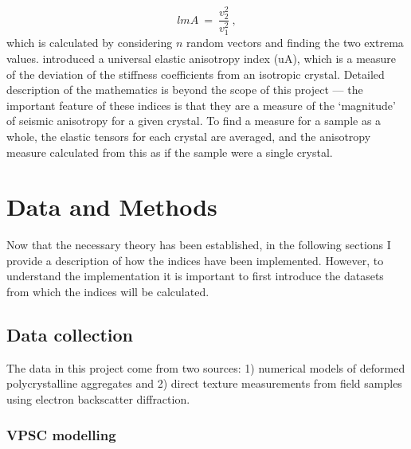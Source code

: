 \documentclass[a4paper,12pt,twoside]{report}
\numberwithin{equation}{chapter}
\begin{document}
\begin{equation}
lmA\ =\ \frac{v_2^2}{v_1^2}\ ,
\end{equation}   
\noindent
which is calculated by considering $n$ random vectors and finding the two extrema values. \cite{Ranganathan2008} introduced a universal elastic anisotropy index (uA), which is a measure of the deviation of the stiffness coefficients from an isotropic crystal. Detailed description of the mathematics is beyond the scope of this project \citep[see][]{Ledbetter2006,Ranganathan2008} --- the important feature of these indices is that they are a measure of the \lq{}magnitude\rq{} of seismic anisotropy for a given crystal. To find a measure for a sample as a whole, the elastic tensors for each crystal are averaged, and the anisotropy measure calculated from this as if the sample were a single crystal. 

\chapter{Data and Methods} \label{chap:methods}
\vspace{-1cm}

Now that the necessary theory has been established, in the following sections I provide a description of how the indices have been implemented. However, to understand the implementation it is important to first introduce the datasets from which the indices will be calculated.  

\section{Data collection} \label{sec:data}
The data in this project come from two sources: 1) numerical models of deformed polycrystalline aggregates and 2) direct texture measurements from field samples using electron backscatter diffraction. 

\subsection{VPSC modelling}
\end{document}
